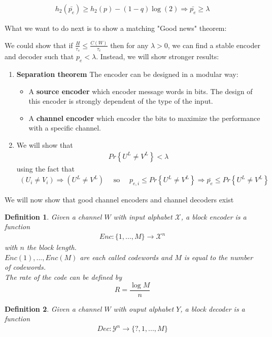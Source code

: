 \documentclass[twoside]{article}
\newtheorem{definition}{Definition}[section]
\theoremstyle{definition} %
\renewcommand{\Pr}[1]{Pr\left\{#1\right\}}
\def\X{\mathcal{X}}
\def\Y{\mathcal{Y}}
\begin{document}
\begin{align*}
  h_2(\bar{p_e}) \geq h_2(p) - (1 - q)\log(2) \Rightarrow \bar{p_e} \geq \lambda
\end{align*}

What we want to do next is to show a matching "Good news" theorem:

We could show that if $\frac{H}{\tau_s} \leq \frac{C(W)}{\tau_c}$ then for any $\lambda > 0$, we can find a stable encoder and decoder such that $p_e < \lambda$.
Instead, we will show stronger results:
\begin{enumerate}
  \item \textbf{Separation theorem}
    The encoder can be designed in a modular way:
    \begin{itemize}
      \item A \textbf{source encoder} which encoder message words in bits. The design of this encoder is strongly dependent of the type of the input.
      \item A \textbf{channel encoder} which encoder the bits to maximize the performance with a specific channel.
    \end{itemize}
  \item We will show that
  \begin{align*}
    \Pr{U^L \neq V^L} < \lambda
  \end{align*}
  using the fact that
  \begin{align*}
    (U_i \neq V_i) \Rightarrow (U^L \neq V^L)
    \quad \text{ so } \quad
    p_{e,i} \leq \Pr{U^L \neq V^L} \Rightarrow \bar{p_e} \leq \Pr{U^L \neq V^L}
  \end{align*}
\end{enumerate}

We will now show that good channel encoders and channel decoders exist

\begin{definition}
  Given a channel $W$ with input alphabet $\X$, a block encoder is a function
  \begin{align*}
    Enc: \{1, ..., M\} \rightarrow \X^n
  \end{align*}
  with $n$ the block length.\\
  $Enc(1), ..., Enc(M)$ are each called codewords and $M$ is equal to the number of codewords.\\
  The rate of the code can be defined by
  $$ R = \frac{\log M}{n} $$
\end{definition}
\begin{definition}
  Given a channel $W$ with ouput alphabet $Y$, a block decoder is a function
  \begin{align*}
    Dec: \Y^n \rightarrow \{ ?, 1, ..., M\}
  \end{align*}
\end{definition}
\end{document}

